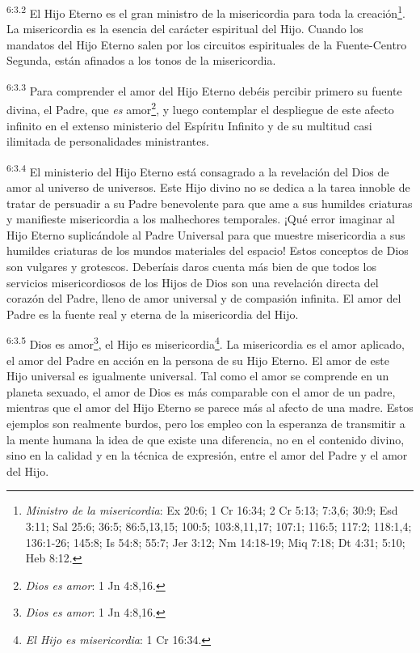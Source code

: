 \par
\textsuperscript{6:3.2} El Hijo Eterno es el gran ministro de la misericordia para toda la creación\footnote{\textit{Ministro de la misericordia}: Ex 20:6; 1 Cr 16:34; 2 Cr 5:13; 7:3,6; 30:9; Esd 3:11; Sal 25:6; 36:5; 86:5,13,15; 100:5; 103:8,11,17; 107:1; 116:5; 117:2; 118:1,4; 136:1-26; 145:8; Is 54:8; 55:7; Jer 3:12; Nm 14:18-19; Miq 7:18; Dt 4:31; 5:10; Heb 8:12.}. La misericordia es la esencia del carácter espiritual del Hijo. Cuando los mandatos del Hijo Eterno salen por los circuitos espirituales de la Fuente-Centro Segunda, están afinados a los tonos de la misericordia.

\par
\textsuperscript{6:3.3} Para comprender el amor del Hijo Eterno debéis percibir primero su fuente divina, el Padre, que \textit{es} amor\footnote{\textit{Dios es amor}: 1 Jn 4:8,16.}, y luego contemplar el despliegue de este afecto infinito en el extenso ministerio del Espíritu Infinito y de su multitud casi ilimitada de personalidades ministrantes.

\par
\textsuperscript{6:3.4} El ministerio del Hijo Eterno está consagrado a la revelación del Dios de amor al universo de universos. Este Hijo divino no se dedica a la tarea innoble de tratar de persuadir a su Padre benevolente para que ame a sus humildes criaturas y manifieste misericordia a los malhechores temporales. ¡Qué error imaginar al Hijo Eterno suplicándole al Padre Universal para que muestre misericordia a sus humildes criaturas de los mundos materiales del espacio! Estos conceptos de Dios son vulgares y grotescos. Deberíais daros cuenta más bien de que todos los servicios misericordiosos de los Hijos de Dios son una revelación directa del corazón del Padre, lleno de amor universal y de compasión infinita. El amor del Padre es la fuente real y eterna de la misericordia del Hijo.

\par
\textsuperscript{6:3.5} Dios es amor\footnote{\textit{Dios es amor}: 1 Jn 4:8,16.}, el Hijo es misericordia\footnote{\textit{El Hijo es misericordia}: 1 Cr 16:34.}. La misericordia es el amor aplicado, el amor del Padre en acción en la persona de su Hijo Eterno. El amor de este Hijo universal es igualmente universal. Tal como el amor se comprende en un planeta sexuado, el amor de Dios es más comparable con el amor de un padre, mientras que el amor del Hijo Eterno se parece más al afecto de una madre. Estos ejemplos son realmente burdos, pero los empleo con la esperanza de transmitir a la mente humana la idea de que existe una diferencia, no en el contenido divino, sino en la calidad y en la técnica de expresión, entre el amor del Padre y el amor del Hijo.

